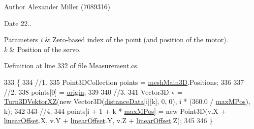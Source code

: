 \begin{DoxyAuthor}{Author}
Alexander Miller (7089316) 
\end{DoxyAuthor}
\begin{DoxyDate}{Date}
22..
\end{DoxyDate}

\begin{DoxyParams}{Parameters}
{\em i} & Zero-\/based index of the point (and position of the motor). \\
\hline
{\em k} & Position of the servo. \\
\hline
\end{DoxyParams}


Definition at line 332 of file Measurement.\+cs.


\begin{DoxyCode}
333         \{
334             \textcolor{comment}{//1.}
335             Point3DCollection points = \hyperlink{class_l_i_d_a_r___controller_1_1_measurement_af5ee635f5060386fb2eb131af46b962e}{meshMain3D}.Positions;
336 
337             \textcolor{comment}{//2.}
338             points[0] = \hyperlink{class_l_i_d_a_r___controller_1_1_measurement_ac0d4306c375f9863f2a1b8591192feca}{origin};
339 
340             \textcolor{comment}{//3.}
341             Vector3D v = \hyperlink{class_l_i_d_a_r___controller_1_1_measurement_aff21228516e88970db70287d41ff2e42}{Turn3DVektorXZ}(\textcolor{keyword}{new} Vector3D(\hyperlink{class_l_i_d_a_r___controller_1_1_measurement_a5ed2a945e26682eabe612fdcbf6d6c54}{distanceData}[i][k], 0, 0), i
       * (360.0 / \hyperlink{class_l_i_d_a_r___controller_1_1_measurement_ae4e112299a3c15095e6148bd06a47946}{maxMPos}), k);
342             
343             \textcolor{comment}{//4.}
344             points[i + 1 + k * \hyperlink{class_l_i_d_a_r___controller_1_1_measurement_ae4e112299a3c15095e6148bd06a47946}{maxMPos}] = \textcolor{keyword}{new} Point3D(v.X + \hyperlink{class_l_i_d_a_r___controller_1_1_measurement_a00cfc32b350bb7516008ec96ad557f8d}{linearOffset}.X, v.Y + 
      \hyperlink{class_l_i_d_a_r___controller_1_1_measurement_a00cfc32b350bb7516008ec96ad557f8d}{linearOffset}.Y, v.Z + \hyperlink{class_l_i_d_a_r___controller_1_1_measurement_a00cfc32b350bb7516008ec96ad557f8d}{linearOffset}.Z);
345 
346         \}
\end{DoxyCode}
